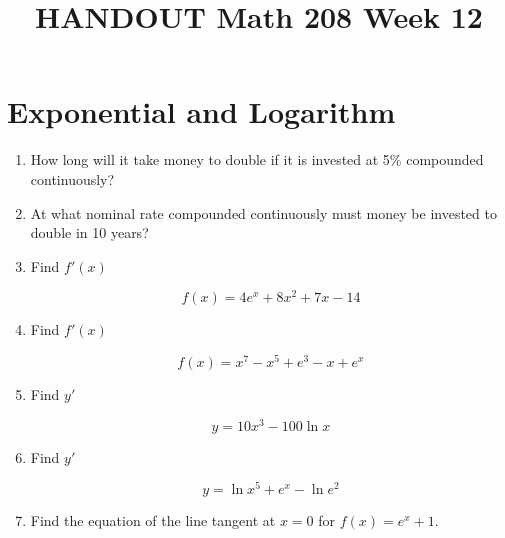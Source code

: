 \documentclass[14pt]{extarticle}
\title{\vspace{-5ex}HANDOUT Math 208 Week 12}
\date{\vspace{-10ex}}
\begin{document}
\maketitle		

\section{Exponential and Logarithm}
\begin{enumerate}
	\item How long will it take money to double if it is invested at 5\% compounded continuously?
	\vspace{2.5cm}
	
	\item At what nominal rate compounded continuously must money be invested to double in 10 years?
	\vspace{2.5cm}
	
	
	\item Find $f'(x)$ \begin{fleqn}\begin{equation*}f(x) = 4e^x + 8x^2 + 7x - 14 \end{equation*} \end{fleqn}
	\vspace{1cm}
	
	\item  Find $f'(x)$
	\begin{fleqn}\begin{equation*}f(x) = x^7-x^5 + e^3-x+e^x \end{equation*} \end{fleqn}
	\vspace{1cm}
	
	\item Find $y'$ \begin{fleqn}\begin{equation*} y=10x^3 - 100\ln x \end{equation*} \end{fleqn}
	\vspace{1cm}
	
	\item Find $y'$ \begin{fleqn}\begin{equation*} y=\ln x^5 +e^x - \ln e^2 \end{equation*} \end{fleqn}
	\vspace{1cm}
	
	\item Find the equation of the line tangent at $x=0$ for $f(x)= e^x+1$.
\end{enumerate}
\vspace{3cm}
\end{document}
